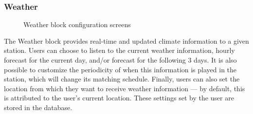 \subsubsection{Weather}

\begin{figure}[htbp]
	\centering
	 \qquad
	 \qquad
	\caption{Weather block configuration screens}
	\label{fig:weather}
\end{figure}

The Weather block provides real-time and updated climate information to a given station. Users can choose to listen to the current weather information, hourly forecast for the current day, and/or forecast for the following 3 days. It is also possible to customize the periodicity of when this information is played in the station, which will change its matching schedule. Finally, users can also set the location from which they want to receive weather information — by default, this is attributed to the user's current location. These settings set by the user are stored in the database.

